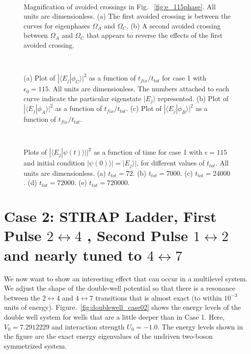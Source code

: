 \begin{figure} 
\ 
\caption{Magnification of avoided crossings in Fig. ~\ref{fig:e_115phase}. All units are dimensionless. (a) The first avoided crossing is  between the curves for  eigenphases  $\Omega_A$ and $\Omega_C$. (b) A second avoided crossing between $\Omega_A$ and $\Omega_C$ that appears to reverse the effects of the first avoided crossing.}
\label{fig:e_115avcrossing}
\end{figure}

\begin{figure} 
\ 
\caption{(a) Plot of $|{\langle}E_j|{\phi}_C{\rangle}|^2$ as a function of $t_{fix}/t_{tot}$ for case 1 with ${\epsilon}_0=115$. All units are dimensionless.  The numbers attached to each curve indicate the particular eigenstate $|E_j{\rangle}$ represented.  (b) Plot of $|{\langle}E_j|{\phi}_A{\rangle}|^2$ as a function of $t_{fix}/t_{tot}$. (c) Plot of $|{\langle}E_j|{\phi}_B{\rangle}|^2$ as a function of $t_{fix}/t_{tot}$.}
\label{fig:e_115states}
\end{figure}

\begin{figure} 
\ 
\caption{Plots of $|{\langle}E_j|{\psi}(t){\rangle|}|^2$ as a function of time for case 1 with $\epsilon=115$  and initial condition $|{\psi}(0){\rangle|}=|E_j{\rangle|}$, for different values of  $t_{tot}$. All units are dimensionless. (a) $t_{tot}=72$. (b) $t_{tot}=7000$. (c) $t_{tot}=24000$. (d) $t_{tot}=72000$. (e) $t_{tot}=720000$.}
\label{fig:e_115timeev}
\end{figure}

%
%
\section{\label{sec:7} Case 2: STIRAP Ladder, First Pulse $2\leftrightarrow4$ , Second Pulse $1\leftrightarrow2$ and nearly tuned to $4\leftrightarrow7$}
\label{chapter-dblwell:section:stirap2}
%
%
We now want to show an interesting effect that can occur in a multilevel system.  We adjust the shape of the double-well potential so that there is a  resonance between the $2 \leftrightarrow 4 $ and $4 \leftrightarrow 7$ transitions that is almost exact (to within $10^{-3}$ units of energy).
Figure.~\ref{fig:doublewell_case02} shows the energy levels of the double well system for wells that are a little deeper than in Case 1.  Here, $V_0 = 7.2912229$ and interaction strength  $U_0 = -1.0$. The energy levels shown in the figure are the exact energy eigenvalues of the undriven two-boson symmetrized system.

